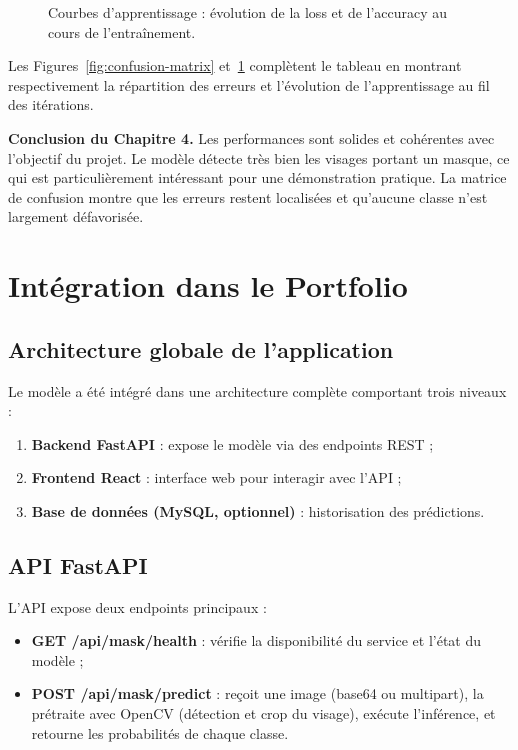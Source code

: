 \documentclass[11pt,a4paper]{article}
\begin{document}
\begin{figure}[H]
\centering
{}
\caption{Courbes d'apprentissage : évolution de la loss et de l'accuracy au cours de l'entraînement.}
\label{fig:training-curves}
\end{figure}

Les Figures~\ref{fig:confusion-matrix} et~\ref{fig:training-curves} complètent le tableau en montrant respectivement la répartition des erreurs et l'évolution de l'apprentissage au fil des itérations.

\textbf{Conclusion du Chapitre 4.} Les performances sont solides et cohérentes avec l'objectif du projet. Le modèle détecte très bien les visages portant un masque, ce qui est particulièrement intéressant pour une démonstration pratique. La matrice de confusion montre que les erreurs restent localisées et qu'aucune classe n'est largement défavorisée.

\newpage
\section{Intégration dans le Portfolio}

\subsection{Architecture globale de l'application}

Le modèle a été intégré dans une architecture complète comportant trois niveaux :
\begin{enumerate}
    \item \textbf{Backend FastAPI} : expose le modèle via des endpoints REST ;
    \item \textbf{Frontend React} : interface web pour interagir avec l'API ;
    \item \textbf{Base de données (MySQL, optionnel)} : historisation des prédictions.
\end{enumerate}

\subsection{API FastAPI}

L'API expose deux endpoints principaux :

\begin{itemize}
    \item \textbf{GET /api/mask/health} : vérifie la disponibilité du service et l'état du modèle ;
    \item \textbf{POST /api/mask/predict} : reçoit une image (base64 ou multipart), la prétraite avec OpenCV (détection et crop du visage), exécute l'inférence, et retourne les probabilités de chaque classe.
\end{itemize}
\end{document}
